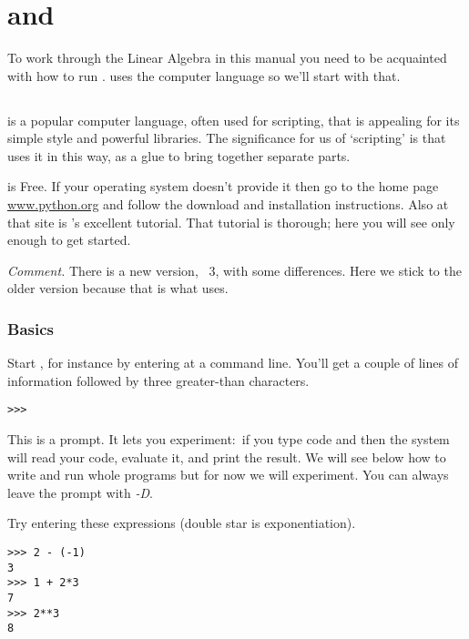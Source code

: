 \chapter{\python{} and \Sage{}}

To work through the Linear Algebra in this manual
you need to be acquainted with how to run \Sage. 
\Sage{} uses the computer language \python{} so we'll start with that.


\section{\python}
\python{} is a popular computer language, often used for scripting,
that is appealing for its simple style and powerful libraries.
The significance for us of `scripting' is that \Sage{} uses it in this way,
as a glue to bring together separate parts.

\python{} is Free.
If your operating system doesn't provide it then go to the home 
page \href{http://www.python.org}{\url{www.python.org}} and follow the
download and installation instructions.
Also at that site is \python's excellent tutorial.
That tutorial is thorough; 
here you will see only enough \python{} to get started.

\smallskip
\textit{Comment.}
There is a new version, \python~3, with some differences.
Here we stick to the older version 
because that is what \Sage{} uses.


\subsection{Basics}
Start \python, for instance by entering 
at a command line.
You'll get a couple of lines of 
information followed by three greater-than
characters.
\begin{lstlisting}[style=python]
>>>   
\end{lstlisting}
This is a prompt.
It lets you experiment:~if you type 
\python{} code and  then the system
will read your code, evaluate it, and print the result.
We will see below how to write and run whole programs
but for now we will experiment.
You can always leave the prompt with \textit{-D}.

Try entering these expressions (double star is exponentiation).
\begin{lstlisting}[style=python]
>>> 2 - (-1)
3
>>> 1 + 2*3
7
>>> 2**3
8  
\end{lstlisting}

